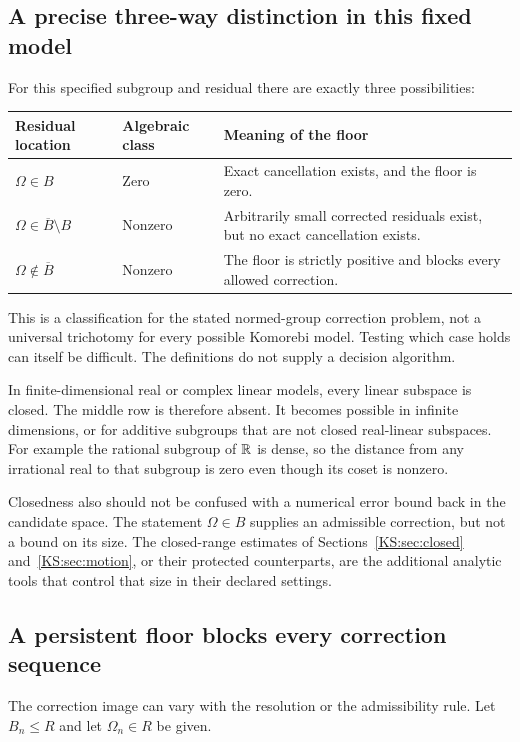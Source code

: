 \subsection{A precise three-way distinction in this fixed model}
For this specified subgroup and residual there are exactly three possibilities:
\begin{center}
\begin{tabularx}{\linewidth}{@{}p{.29\linewidth}p{.20\linewidth}X@{}}
\toprule Residual location & Algebraic class & Meaning of the floor\\\midrule
\(\Omega\in B\) & Zero & Exact cancellation exists, and the floor is zero.\\
\(\Omega\in\overline B\setminus B\) & Nonzero & Arbitrarily small corrected residuals exist, but no exact cancellation exists.\\
\(\Omega\notin\overline B\) & Nonzero & The floor is strictly positive and blocks every allowed correction.\\\bottomrule
\end{tabularx}
\end{center}
This is a classification for the stated normed-group correction problem, not a universal trichotomy for every possible Komorebi model. Testing which case holds can itself be difficult. The definitions do not supply a decision algorithm.

In finite-dimensional real or complex linear models, every linear subspace is closed. The middle row is therefore absent. It becomes possible in infinite dimensions, or for additive subgroups that are not closed real-linear subspaces. For example the rational subgroup of \(\mathbb R\) is dense, so the distance from any irrational real to that subgroup is zero even though its coset is nonzero.

Closedness also should not be confused with a numerical error bound back in the candidate space. The statement \(\Omega\in B\) supplies an admissible correction, but not a bound on its size. The closed-range estimates of Sections~\ref{KS:sec:closed} and~\ref{KS:sec:motion}, or their protected counterparts, are the additional analytic tools that control that size in their declared settings.

\subsection{A persistent floor blocks every correction sequence}
The correction image can vary with the resolution or the admissibility rule. Let \(B_n\le R\) and let \(\Omega_n\in R\) be given.

